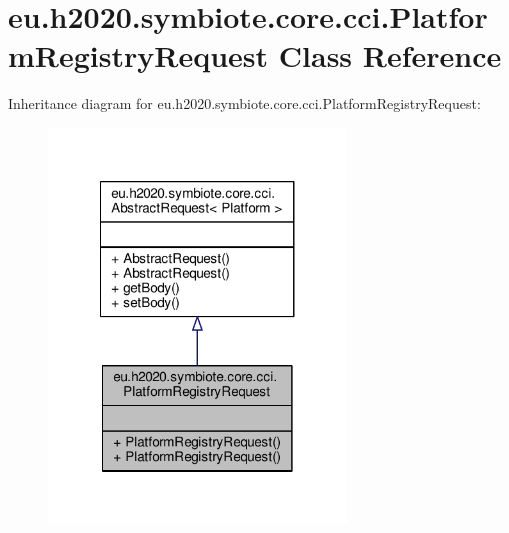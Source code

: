 \hypertarget{classeu_1_1h2020_1_1symbiote_1_1core_1_1cci_1_1PlatformRegistryRequest}{}\section{eu.\+h2020.\+symbiote.\+core.\+cci.\+Platform\+Registry\+Request Class Reference}
\label{classeu_1_1h2020_1_1symbiote_1_1core_1_1cci_1_1PlatformRegistryRequest}


Inheritance diagram for eu.\+h2020.\+symbiote.\+core.\+cci.\+Platform\+Registry\+Request\+:\nopagebreak
\begin{figure}[H]
\begin{center}
\leavevmode
\includegraphics[width=224pt]{classeu_1_1h2020_1_1symbiote_1_1core_1_1cci_1_1PlatformRegistryRequest__inherit__graph}
\end{center}
\end{figure}


